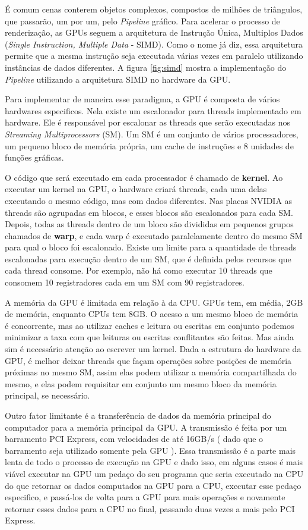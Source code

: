     É comum cenas conterem objetos complexos, compostos de milhões de triângulos, que passarão, um por um, pelo
\textit{Pipeline} gráfico. Para acelerar o processo de renderização, as GPUs seguem a arquitetura de Instrução Única,
Multiplos Dados (\textit{Single Instruction, Multiple Data} - SIMD). Como o nome já diz, essa arquitetura permite que 
a mesma instrução seja executada várias vezes em paralelo utilizando instâncias de dados diferentes. A figura 
\ref{fig:simd} mostra a implementação do \textit{Pipeline} utilizando a arquitetura SIMD no hardware da GPU.
    
    Para implementar de maneira esse paradigma, a GPU é composta de vários hardwares especificos. Nela existe um 
escalonador para threads implementado em hardware. Ele é responsável por escalonar as threads que serão
executadas nos \textit{Streaming Multiprocessors} (SM). Um SM é um conjunto de vários processadores, um pequeno bloco de
memória própria, um cache de instruções e 8 unidades de funções gráficas.

    O código que será executado em cada processador é chamado de \textbf{kernel}. Ao executar um kernel na GPU, o 
hardware criará threads, cada uma delas executando o mesmo código, mas com dados diferentes. Nas placas NVIDIA as threads 
são agrupadas em blocos, e esses blocos são escalonados para cada SM. Depois, todas as threads dentro de um bloco são 
divididas em pequenos grupos chamados de \textbf{warp}\cite{paulo}, e cada warp é executado paralelamente dentro do 
mesmo SM para qual o bloco foi escalonado. Existe um limite para a quantidade de threads escalonadas para execução
dentro de um SM, que é definida pelos recursos que cada thread consome. Por exemplo, não há como executar 10 threads
que consomem 10 registradores cada em um SM com 90 registradores.

    A memória da GPU é limitada em relação à da CPU. GPUs tem, em média, 2GB
de memória, enquanto CPUs tem 8GB. O acesso a um mesmo bloco de memória é concorrente, mas ao utilizar caches e leitura 
ou escritas em conjunto podemos minimizar a taxa com que leituras ou escritas conflitantes são feitas. Mas ainda sim é 
necessário atenção ao escrever um kernel. Dada a estrutura do hardware da GPU, é melhor deixar threads que façam 
operações sobre posições de memória próximas no mesmo SM, assim elas podem utilizar a memória compartilhada do mesmo, e 
elas podem requisitar em conjunto um mesmo bloco da memória principal, se necessário.

    Outro fator limitante é a transferência de dados da memória principal do computador para a memória 
principal da GPU. A transmissão é feita por um barramento PCI Express, com velocidades de até 16GB/s ( dado que o
barramento seja utilizado somente pela GPU ). Essa transmissão é a parte mais lenta de todo o
processo de execução na GPU e dado isso, em alguns casos é mais viável executar na GPU um pedaço do seu programa que 
seria executado na CPU do que retornar os dados computados na GPU para a CPU, executar esse pedaço especifico, e 
passá-los de volta para a GPU para mais operações e novamente retornar esses dados para a CPU no final, passando duas 
vezes a mais pelo PCI Express. 

